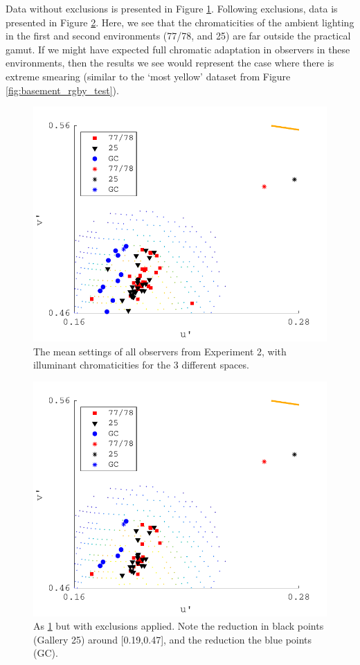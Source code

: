 Data without exclusions is presented in Figure \ref{fig:exp2wo}. Following exclusions, data is presented in Figure \ref{fig:exp2}. Here, we see that the chromaticities of the ambient lighting in the first and second environments (77/78, and 25) are far outside the practical gamut. If we might have expected full chromatic adaptation in observers in these environments, then the results we see would represent the case where there is extreme smearing (similar to the `most yellow' dataset from Figure \ref{fig:basement_rgby_test}). 
\begin{figure}[hbtp] 
\includegraphics[max width=\textwidth]{figs/tablet/exp2_withoutExclusion.pdf} 
\caption{The mean settings of all observers from Experiment 2, with illuminant chromaticities for the 3 different spaces.}
\label{fig:exp2wo}
\end{figure}

\begin{figure}[hbtp] 
\includegraphics[max width=\textwidth]{figs/tablet/exp2.pdf} 
\caption{As \ref{fig:exp2wo} but with exclusions applied. Note the reduction in black points (Gallery 25) around [0.19,0.47], and the reduction the blue points (GC).}
\label{fig:exp2}
\end{figure}

